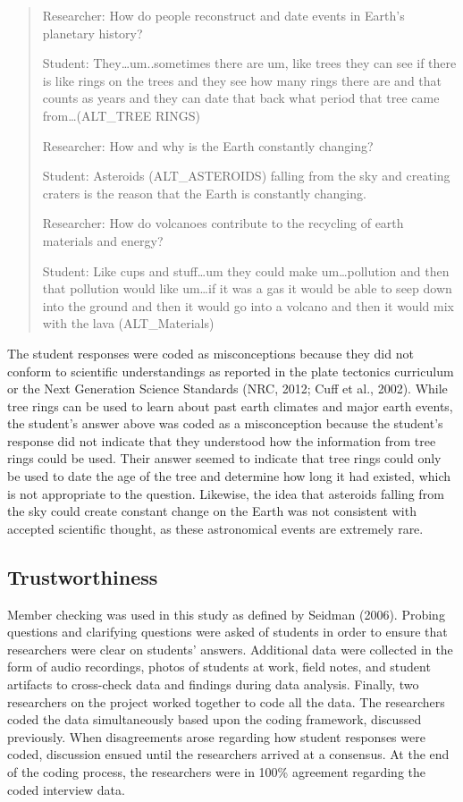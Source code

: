 \documentclass[11.5pt]{sig-alternate} %
\begin{document}
\begin{large}
\begin{quote}

Researcher: How do people reconstruct and date events in Earth’s planetary history?

Student: They…um..sometimes there are um, like trees they can see if there is like rings on the trees and they see how many rings there are and that counts as years and they can date that back what period that tree came from…(ALT\_TREE RINGS)

Researcher:  How and why is the Earth constantly changing?

Student:  Asteroids (ALT\_ASTEROIDS) falling from the sky and creating craters is the reason that the Earth is constantly changing.
 
Researcher: How do volcanoes contribute to the recycling of earth materials and energy?

Student: Like cups and stuff…um they could make um…pollution and then that pollution would like um…if it was a gas it would be able to seep down into the ground and then it would go into a volcano and then it would mix with the lava (ALT\_Materials)

\end{quote}

The student responses were coded as misconceptions because they did not conform to scientific understandings as reported in the plate tectonics curriculum or the Next Generation Science Standards (NRC, 2012; Cuff et al., 2002). While tree rings can be used to learn about past earth climates and major earth events, the student’s answer above was coded as a misconception because the student’s response did not indicate that they understood how the information from tree rings could be used.  Their answer seemed to indicate that tree rings could only be used to date the age of the tree and determine how long it had existed, which is not appropriate to the question.  Likewise, the idea that asteroids falling from the sky could create constant change on the Earth was not consistent with accepted scientific thought, as these astronomical events are extremely rare.

\subsection*{Trustworthiness}

Member checking was used in this study as defined by Seidman (2006).  Probing questions and clarifying questions were asked of students in order to ensure that researchers were clear on students’ answers.  Additional data were collected in the form of audio recordings, photos of students at work, field notes, and student artifacts to cross-check data and findings during data analysis.  Finally, two researchers on the project worked together to code all the data.  The researchers coded the data simultaneously based upon the coding framework, discussed previously.  When disagreements arose regarding how student responses were coded, discussion ensued until the researchers arrived at a consensus.  At the end of the coding process, the researchers were in 100\% agreement regarding the coded interview data.  


\end{large}
\end{document}
